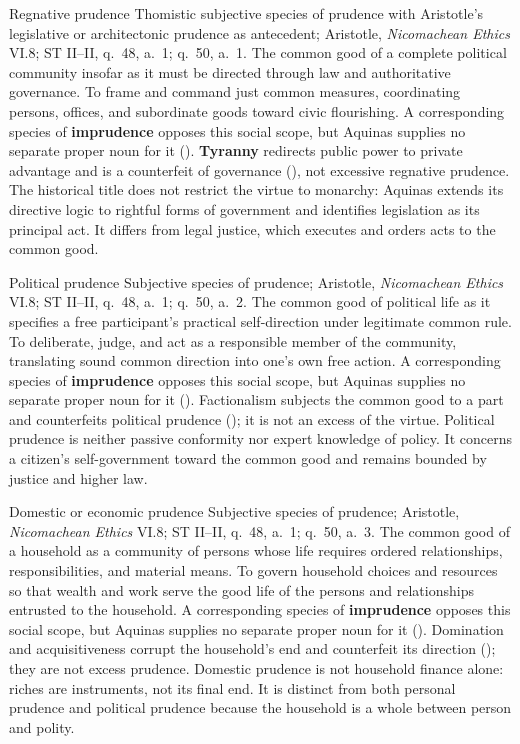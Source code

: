 \virtuedossier
  {Regnative prudence}
  {Thomistic subjective species of prudence with Aristotle's legislative or architectonic prudence as antecedent; Aristotle, \emph{Nicomachean Ethics} VI.8; ST II--II, q.~48, a.~1; q.~50, a.~1.}
  {The common good of a complete political community insofar as it must be directed through law and authoritative governance.}
  {To frame and command just common measures, coordinating persons, offices, and subordinate goods toward civic flourishing.}
  {A corresponding species of \textbf{imprudence} opposes this social scope, but Aquinas supplies no separate proper noun for it ().}
  {\textbf{Tyranny} redirects public power to private advantage and is a counterfeit of governance (), not excessive regnative prudence.}
  {The historical title does not restrict the virtue to monarchy: Aquinas extends its directive logic to rightful forms of government and identifies legislation as its principal act. It differs from legal justice, which executes and orders acts to the common good.}

\virtuedossier
  {Political prudence}
  {Subjective species of prudence; Aristotle, \emph{Nicomachean Ethics} VI.8; ST II--II, q.~48, a.~1; q.~50, a.~2.}
  {The common good of political life as it specifies a free participant's practical self-direction under legitimate common rule.}
  {To deliberate, judge, and act as a responsible member of the community, translating sound common direction into one's own free action.}
  {A corresponding species of \textbf{imprudence} opposes this social scope, but Aquinas supplies no separate proper noun for it ().}
  {Factionalism subjects the common good to a part and counterfeits political prudence (); it is not an excess of the virtue.}
  {Political prudence is neither passive conformity nor expert knowledge of policy. It concerns a citizen's self-government toward the common good and remains bounded by justice and higher law.}

\virtuedossier
  {Domestic or economic prudence}
  {Subjective species of prudence; Aristotle, \emph{Nicomachean Ethics} VI.8; ST II--II, q.~48, a.~1; q.~50, a.~3.}
  {The common good of a household as a community of persons whose life requires ordered relationships, responsibilities, and material means.}
  {To govern household choices and resources so that wealth and work serve the good life of the persons and relationships entrusted to the household.}
  {A corresponding species of \textbf{imprudence} opposes this social scope, but Aquinas supplies no separate proper noun for it ().}
  {Domination and acquisitiveness corrupt the household's end and counterfeit its direction (); they are not excess prudence.}
  {Domestic prudence is not household finance alone: riches are instruments, not its final end. It is distinct from both personal prudence and political prudence because the household is a whole between person and polity.}

